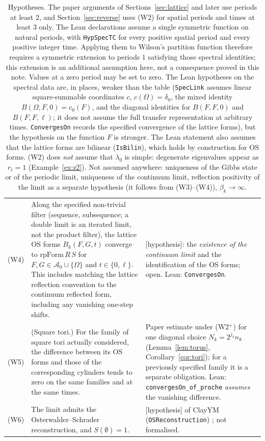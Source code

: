 \documentclass[11pt,a4paper]{article}
\theoremstyle{plain}
\theoremstyle{definition}
\theoremstyle{remark}
\numberwithin{equation}{section}
\newcommand{\st}[1]{\textsf{[#1]}}
\newcommand{\cA}{\mathcal{A}}
\begin{document}
\begin{table}[ht]
\begin{tabular}{@{}>{\raggedright\arraybackslash}p{}>{\raggedright\arraybackslash}p{}%
>{\raggedright\arraybackslash}p{}@{}}
(W4) & Along the specified non-trivial filter (sequence, subsequence; a double limit is an iterated limit, not the product filter), the
lattice OS forms $B_k(F,G,t)$ converge to $\mathrm{rpForm}\,R\,S$ for $F,G\in\cA_0\cup\{\Omega\}$ and $t\in\{0,\ell\}$. This includes matching the
lattice reflection convention to the continuum reflected form, including any vanishing one-step shifts. & \st{hypothesis}: the
\emph{existence of the continuum limit} and the identification of the OS forms; open. Lean: \texttt{ConvergesOn}.\\
(W5) & (Square tori.) For the family of square tori actually considered, the difference between its OS forms and those of the corresponding
cylinders tends to zero on the same families and at the same times. & Paper estimate under (W2$^+$) for one diagonal choice
$N_k=2^{j_k}n_k$ (Lemma~\ref{lem:torus}, Corollary~\ref{cor:tori}); for a previously specified family it is a separate obligation. Lean:
\texttt{convergesOn\_of\_proche} \emph{assumes} the vanishing difference.\\
(W6) & The limit admits the Osterwalder--Schrader reconstruction, and $S(\emptyset)=1$. & \st{hypothesis} of ClayYM
(\texttt{OSReconstruction}) \cite{OS73,OS75,ClayYM}; not formalised.\\
\bottomrule
\end{tabular}
\caption{Hypotheses. The paper arguments of Sections~\ref{sec:lattice} and later use periods at least $2$, and Section~\ref{sec:reverse} uses (W2) for spatial periods and times at least $3$ only. The Lean declarations assume a single symmetric function on natural periods, with \texttt{HypSpecTC} for every positive spatial period and every positive integer time. Applying them to Wilson's partition function therefore requires a symmetric extension to periods $1$ satisfying those spectral identities; this extension is an additional assumption here, not a consequence proved in this note. Values at a zero period may be set to zero. The Lean hypotheses on the spectral data are, in places, weaker than the table (\texttt{SpecLink} assumes linear square-summable coordinates $c$, $c(\Omega)=\delta_0$, the mixed identity $B(\Omega,F,0)=c_0(F)$, and the diagonal identities for $B(F,F,0)$ and $B(F,F,\ell)$; it does not assume the full transfer representation at arbitrary times. \texttt{ConvergesOn} records the specified convergence of the lattice forms), but the hypothesis on the function $F$ is stronger. The Lean
statement also assumes that the lattice forms are bilinear (\texttt{IsBilin}), which holds by construction for OS forms. (W2) does
\emph{not} assume that $\lambda_0$ is simple: degenerate eigenvalues appear as $r_i=1$ (Example~\ref{ex:z2}). Not assumed anywhere: uniqueness of the Gibbs state or of the periodic limit, uniqueness of the continuum limit, reflection positivity of
the limit as a separate hypothesis (it follows from (W3)--(W4)), $\beta_k\to\infty$.}
\label{tab:hyp}
\end{table}
\end{document}
